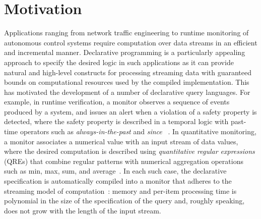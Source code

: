 \section{Motivation}

Applications ranging from network traffic engineering to runtime monitoring of autonomous control systems
require computation over data streams in an efficient and incremental manner.
Declarative programming is a particularly appealing approach to specify the desired logic in such
applications as it can provide natural and high-level constructs for processing streaming data
with guaranteed bounds on computational resources used by the compiled implementation.
This has motivated the development of a number of declarative query languages.
For example, in runtime verification, a monitor observes a sequence of events produced by
a system, and issues an alert when a violation of a safety property is detected, where the safety property
is described in a temporal logic with past-time operators such as \emph{always-in-the-past} and \emph{since}
~\cite{manna2012temporal,havelund2004efficient}.
In quantitative monitoring, a monitor associates a numerical value with an input stream of data values,
where the desired computation is described using \emph{quantitative regular expressions} (QREs) that combine
regular patterns with numerical aggregation operations such as min, max, sum, and average~\cite{QRE,StreamQRE,YLMMAL2017NQRE}.
In each such case, the declarative specification is automatically compiled into a monitor that
adheres to the streaming model of computation~\cite{M2005DS}: memory and per-item
processing time is polynomial in the size of the specification of the query and, roughly speaking,
does not grow with the length of the input stream.

